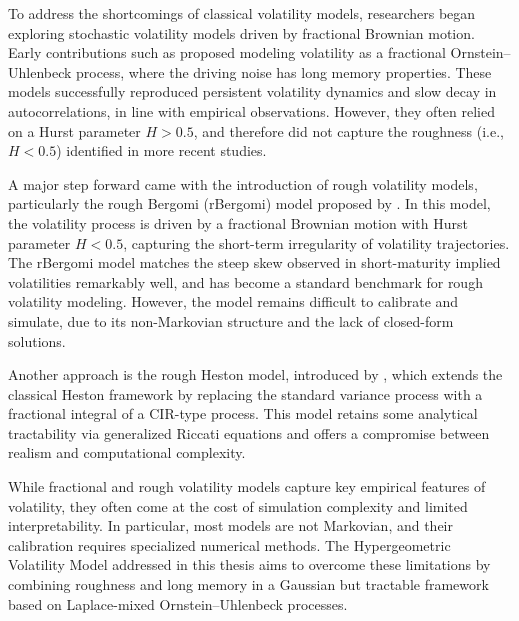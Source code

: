 To address the shortcomings of classical volatility models, researchers began exploring stochastic volatility models driven by fractional Brownian motion. Early contributions such as \citet{ComteRenault1998} proposed modeling volatility as a fractional Ornstein--Uhlenbeck process, where the driving noise has long memory properties. These models successfully reproduced persistent volatility dynamics and slow decay in autocorrelations, in line with empirical observations. However, they often relied on a Hurst parameter \( H > 0.5 \), and therefore did not capture the roughness (i.e., \( H < 0.5 \)) identified in more recent studies.

A major step forward came with the introduction of rough volatility models, particularly the rough Bergomi (rBergomi) model proposed by \citet{BayerFrizGatheral2016}. In this model, the volatility process is driven by a fractional Brownian motion with Hurst parameter \( H < 0.5 \), capturing the short-term irregularity of volatility trajectories. The rBergomi model matches the steep skew observed in short-maturity implied volatilities remarkably well, and has become a standard benchmark for rough volatility modeling. However, the model remains difficult to calibrate and simulate, due to its non-Markovian structure and the lack of closed-form solutions.

Another approach is the rough Heston model, introduced by \citet{ElEuchRosenbaum2019}, which extends the classical Heston framework by replacing the standard variance process with a fractional integral of a CIR-type process. This model retains some analytical tractability via generalized Riccati equations and offers a compromise between realism and computational complexity.

While fractional and rough volatility models capture key empirical features of volatility, they often come at the cost of simulation complexity and limited interpretability. In particular, most models are not Markovian, and their calibration requires specialized numerical methods. The Hypergeometric Volatility Model addressed in this thesis aims to overcome these limitations by combining roughness and long memory in a Gaussian but tractable framework based on Laplace-mixed Ornstein--Uhlenbeck processes.
